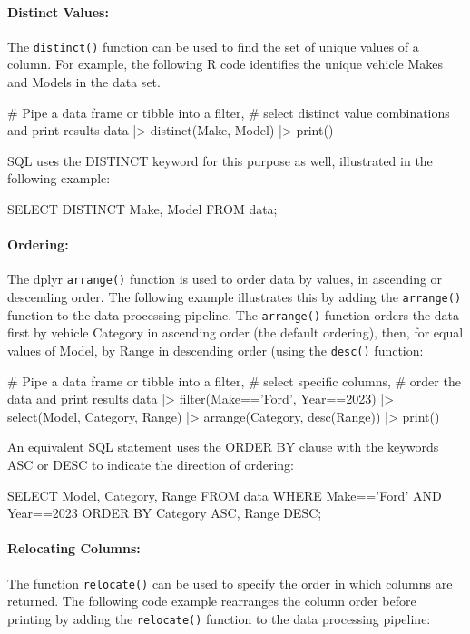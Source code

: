 \paragraph*{Distinct Values:} The \texttt{distinct()} function can be used to find the set of unique values of a column. For example, the following R code identifies the unique vehicle Makes and Models in the data set. 

\begin{Rcode}
# Pipe a data frame or tibble into a filter,
# select distinct value combinations and print results
data |> 
  distinct(Make, Model) |>
  print()
\end{Rcode}

SQL uses the DISTINCT keyword for this purpose as well, illustrated in the following example:

\begin{sqlcode}
SELECT DISTINCT Make, Model 
  FROM data;
\end{sqlcode}

\paragraph*{Ordering:} The dplyr \texttt{arrange()} function is used to order data by values, in ascending or descending order. The following example illustrates this by adding the \texttt{arrange()} function to the data processing pipeline. The \texttt{arrange()} function orders the data first by vehicle Category in ascending order (the default ordering), then, for equal values of Model, by Range in descending order (using the \texttt{desc()} function:

\begin{Rcode}
# Pipe a data frame or tibble into a filter,
# select specific columns,
# order the data and print results
data |> 
  filter(Make=='Ford', Year==2023) |> 
  select(Model, Category, Range) |>
  arrange(Category, desc(Range)) |>
  print()
\end{Rcode}

An equivalent SQL statement uses the ORDER BY clause with the keywords ASC or DESC to indicate the direction of ordering:

\begin{sqlcode}
SELECT Model, Category, Range
   FROM data 
   WHERE Make=='Ford' AND Year==2023
   ORDER BY Category ASC, Range DESC;
\end{sqlcode}

\paragraph*{Relocating Columns:} The function \texttt{relocate()} can be used to specify the order in which columns are returned. The following code example rearranges the column order before printing by adding the \texttt{relocate()} function to the data processing pipeline:

